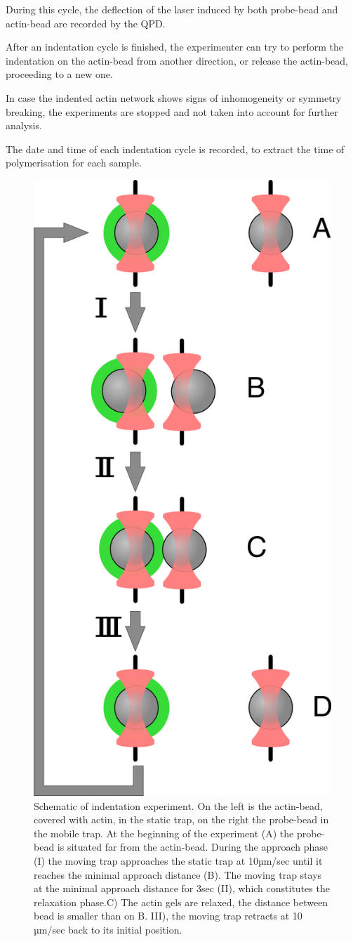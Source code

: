 \documentclass[A4paperpaper,11pt,english]{sphinxmanual}
\begin{document}
During this cycle, the deflection of the laser induced by both probe-bead and
actin-bead are recorded by the QPD.

After an indentation cycle is finished, the experimenter can try to perform the
indentation on the actin-bead from another direction, or release the actin-bead,
proceeding to a new one.

In case the indented actin network shows signs of inhomogeneity or
symmetry breaking, the experiments are stopped and not taken into account for
further analysis.

The date and time of each indentation cycle is recorded, to extract the time of
polymerisation for each sample.
\begin{figure}[htbp]
\centering
\capstart

\includegraphics[width=0.500\linewidth]{beed_move.png}
\caption{Schematic of indentation experiment. On the left is the actin-bead, covered
with actin, in the static trap, on the right the probe-bead in the mobile
trap. At the beginning of the experiment (A) the probe-bead is situated far from
the actin-bead. During the approach phase (I) the moving trap approaches
the static trap at 10µm/sec until it reaches the minimal approach
distance (B). The moving trap stays at the minimal approach distance for
3sec (II), which constitutes the relaxation phase.C) The actin gels are
relaxed, the distance between bead is smaller than on B. III), the moving
trap retracts at 10 µm/sec back to its initial position.}\label{index-latex:bead-move}\end{figure}
\end{document}

